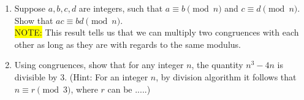 \documentclass[11pt]{article}
\newcounter{Quesnumb}  %
\newcommand{\problemnum}{%
            \addtocounter{Quesnumb}{1}%
            \arabic{Quesnumb}}
\begin{document}
\begin{problem}{\problemnum}
\begin{enumerate}[label=\alph*).]
\item Suppose $a,b,c,d$ are integers, such that $a \equiv b \pmod{n}$ and $c \equiv d \pmod{n}$. Show that $ac \equiv bd \pmod{n}$.\\
\colorbox{yellow}{\textsf{NOTE:}} This result tells us that we can multiply two congruences with each other as long as they are with regards to the same modulus.

\item Using congruences, show that for any integer $n$, the quantity $n^3-4n$ is divisible by $3$. (\textsf{Hint:} For an integer $n$, by division algorithm it follows that $n \equiv r \pmod{3}$, where $r$ can be .....)
\end{enumerate}
\end{problem}
\end{document}
